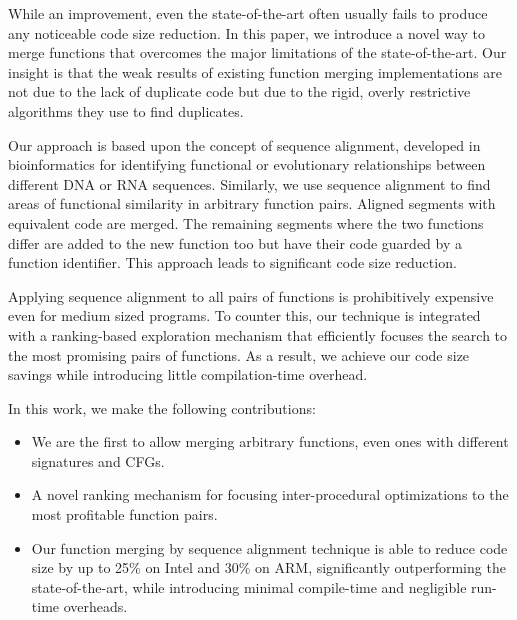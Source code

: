 \documentclass[10pt,twocolumn,nocopyrightspace]{sigplanconf}
\begin{document}
While an improvement, even the state-of-the-art often usually fails to produce any
noticeable code size reduction. In this paper, we introduce a novel way to merge
functions that overcomes the major limitations of the state-of-the-art. Our
insight is that the weak results of existing function merging implementations
are not due to the lack of duplicate code but due to the rigid, overly restrictive
algorithms they use to find duplicates.

Our approach is based upon the concept of sequence alignment, developed in
bioinformatics for identifying functional or evolutionary relationships between
different DNA or RNA sequences. Similarly, we use sequence alignment to find
areas of functional similarity in arbitrary function pairs. Aligned segments
with equivalent code are merged. The remaining segments where the two functions
differ are added to the new function too but have their code guarded by a
function identifier. This approach leads to significant code size reduction.

Applying sequence alignment to all pairs of functions is prohibitively expensive
even for medium sized programs. To counter this, our technique is integrated with
a ranking-based exploration mechanism that efficiently focuses the search to the most
promising pairs of functions. %
As a result, we achieve our code size savings while introducing little compilation-time
overhead.


In this work, we make the following contributions:
\begin{itemize}
  \item We are the first to allow merging arbitrary functions, even ones with
    different signatures and CFGs.
  \item A novel ranking mechanism for focusing inter-procedural optimizations
    to the most profitable function pairs.
  \item Our function merging by sequence alignment technique is able to reduce
     code size by up to 25\% on Intel and 30\% on ARM, significantly outperforming the
     state-of-the-art, while introducing minimal compile-time and negligible run-time overheads.
\end{itemize}
\end{document}
